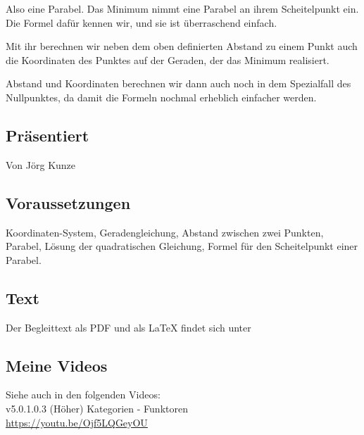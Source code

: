\documentclass[a4paper]{amsart}
\theoremstyle{definition}
\begin{document}
Also eine Parabel. Das Minimum nimmt eine Parabel an ihrem Scheitelpunkt ein. Die Formel dafür kennen wir, und sie ist überraschend einfach.

Mit ihr berechnen wir neben dem oben definierten Abstand zu einem Punkt auch die Koordinaten des Punktes auf der Geraden, der das Minimum realisiert. 

Abstand und Koordinaten berechnen wir dann auch noch in dem Spezialfall des Nullpunktes, da damit die Formeln nochmal erheblich einfacher werden.

\subsection*{Präsentiert}
Von Jörg Kunze

\subsection*{Voraussetzungen}
Koordinaten-System, Geradengleichung, Abstand zwischen zwei Punkten, Parabel, Lösung der quadratischen Gleichung, Formel für den Scheitelpunkt einer Parabel.

\subsection*{Text}
Der Begleittext als PDF und als LaTeX findet sich unter
{\tiny
   \url{}
}

\subsection*{Meine Videos}
Siehe auch in den folgenden Videos:\\
v5.0.1.0.3 (Höher) Kategorien - Funktoren\\
\url{https://youtu.be/Ojf5LQGeyOU}\\
\end{document}
